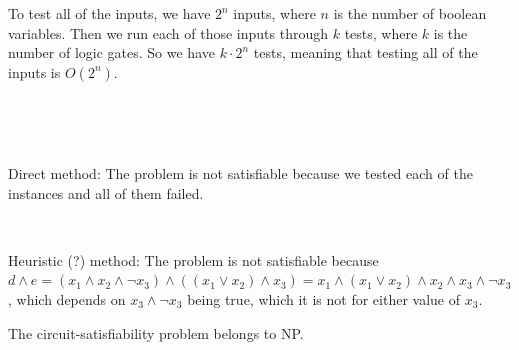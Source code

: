\vskip 12pt

To test all of the inputs, we have $2^n$ inputs, where $n$ is the number of boolean variables.  Then we run each of those inputs through $k$ tests, where $k$ is the number of logic gates.  So we have $k\cdot 2^n$ tests, meaning that testing all of the inputs is $O(2^n)$.  

\


\

Direct method:  The problem is not satisfiable because we tested each of the instances and all of them failed.  

\

Heuristic (?) method:  The problem is not satisfiable because $d \land e = (x_1 \land x_2 \land \lnot x_3) \land ((x_1 \lor x_2) \land x_3) = x_1 \land (x_1 \lor x_2) \land x_2 \land x_3 \land \lnot x_3$, which depends on $x_3 \land \lnot x_3$ being true, which it is not for either value of $x_3$.  


\begin{lemma}
	The circuit-satisfiability problem belongs to NP.
\end{lemma}

